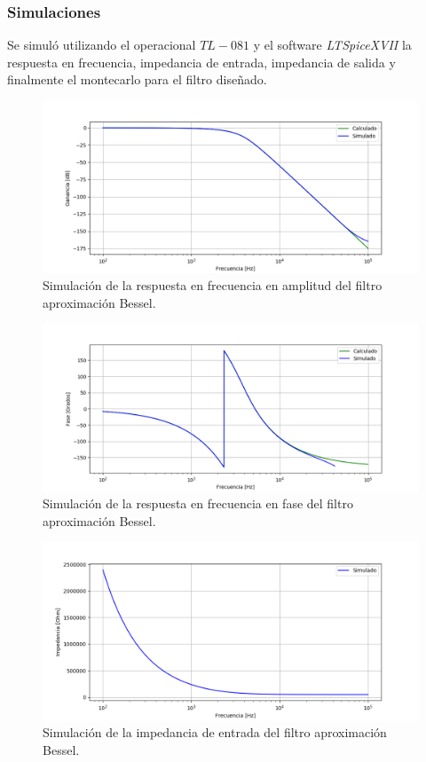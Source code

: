 \subsubsection{Simulaciones}

Se simuló utilizando el operacional $TL-081$ y el software \textit{LTSpiceXVII} la respuesta en frecuencia, impedancia de entrada, impedancia de salida y finalmente el montecarlo para el filtro diseñado.

\begin{figure}[H]
\centering
	\centering
	\includegraphics[width=\textwidth]{Imagenes-Ej1/bessel_hs_sim.png}
	\caption{Simulación de la respuesta en frecuencia en amplitud del filtro aproximación Bessel.}
	\label{bes_gain_sim}
\end{figure}

\begin{figure}[H]
\centering
	\centering
	\includegraphics[width=\textwidth]{Imagenes-Ej1/bessel_hspha_sim.png}
	\caption{Simulación de la respuesta en frecuencia en fase del filtro aproximación Bessel.}
	\label{bes_phase_sim}
\end{figure}

\begin{figure}[H]
\centering
	\centering
	\includegraphics[width=\textwidth]{Imagenes-Ej1/bessel_zin_sim.png}
	\caption{Simulación de la impedancia de entrada del filtro aproximación Bessel.}
	\label{bes_zin_sim}
\end{figure}

